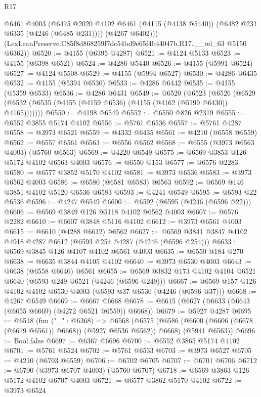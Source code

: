 \begin{lexlean}{R17}
\begin{coremodule}
          @6461
          @4003
          (@6475 @2020 @4102 @6461 (@4115 (@4138 @5440)) (@6482 @231 @6335 (@4246 (@6485 @231))))
          (@4267 @6402)))
      (LexLeanPreserve.C85f8d868259f7dc54bd9e65f4b44047b.R17.__rel_63 @5150 @6362))
@6520 := @4155 (@6395 @4287)
@6521 := @4124 @5133
@6523 := @4155 (@6398 @6521)
@6524 := @4286 @5440
@6526 := @4155 (@5991 @6524)
@6527 := @4124 @5508
@6529 := @4155 (@5994 @6527)
@6530 := @4286 @6435
@6532 := @4155 (@5394 @6530)
@6533 := @4286 @6442
@6535 := @4155 (@5359 @6533)
@6536 := @4286 @6431
@6549 := @6520
    (@6523
      (@6526 (@6529 (@6532 (@6535 (@4155 (@4159 @6536) (@4155 (@4162 (@5199 @6430)) @4165)))))))
@6550 := @4198 @6549
@6552 := @6550 @826 @2319
@6555 := @6552 @3855 @5174 @4102
@6556 := @5761 @6536
@6557 := @5761 @4287
@6558 := @3973 @6521
@6559 := @4332 @6435
@6561 := @4210 (@6558 @6559)
@6562 := @6557 @6561
@6563 := @6556 @6562
@6568 := @6555 (@3973 @6563 @4003) (@5760 @6563)
@6569 := @4220 @6549
@6575 := @6569 @3853 @126 @5172 @4102 @6563 @4003
@6576 := @6550 @153
@6577 := @6576 @2283
@6580 := @6577 @3852 @5170 @4102
@6581 := @3973 @6536
@6583 := @3973 @6562 @4003
@6586 := @6580 (@6581 @6583) @6563
@6592 := @6569 @146 @3851 @4102 @5120 @6536 @6583
@6593 := @4241 @6549
@6595 := @6593 @22 @6536
@6596 := @4247 @6549
@6600 := @6592 (@6595 (@4246 (@6596 @22)))
@6606 := @6569 @3849 @126 @5118 @4102 @6562 @4003
@6607 := @6576 @2282
@6610 := @6607 @3848 @5116 @4102
@6612 := @3973 @6561 @4003
@6615 := @6610 (@4288 @6612) @6562
@6627 := @6569 @3841 @3847 @4102 @4918 @4287 @6612 (@6593 @254 @4287 (@4246 (@6596 @254)))
@6633 := @6569 @3845 @126 @4107 @4102 @6561 @4003
@6635 := @6550 @184 @270
@6638 := @6635 @3844 @4105 @4102
@6640 := @3973 @6530 @4003
@6643 := @6638 (@6558 @6640) @6561
@6655 := @6569 @3832 @173 @4102 @4104 @6521 @6640 (@6593 @249 @6521 (@4246 (@6596 @249)))
@6667 := @6569 @157 @126 @4102 @4102 @6530 @4003 (@6593 @37 @6530 (@4246 (@6596 @37)))
@6668 := @4267 @6549
@6669 := @6667 @6668
@6678 := @6615 (@6627 (@6633 (@6643 (@6655 @6669) (@4272 @6521 @6559)) @6668))
@6679 := @5927 @4287
@6695 := @6518
    (fun ("_" : @6368) =>
    @6568
      (@6575 (@6586 (@6600 (@6606 (@6678 (@6679 @6561)) @6668)) (@5927 @6536 @6562)) @6668)
      (@5941 @6563))
@6696 := Bool.false
@6697 := @6367 @6696
@6700 := @6552 @3865 @5174 @4102
@6701 := @5761 @6524
@6702 := @5761 @6533
@6703 := @3973 @6527
@6705 := @4210 (@6703 @6559)
@6706 := @6702 @6705
@6707 := @6701 @6706
@6712 := @6700 (@3973 @6707 @4003) (@5760 @6707)
@6718 := @6569 @3863 @126 @5172 @4102 @6707 @4003
@6721 := @6577 @3862 @5170 @4102
@6722 := @3973 @6524

\end{coremodule}
\end{lexlean}
